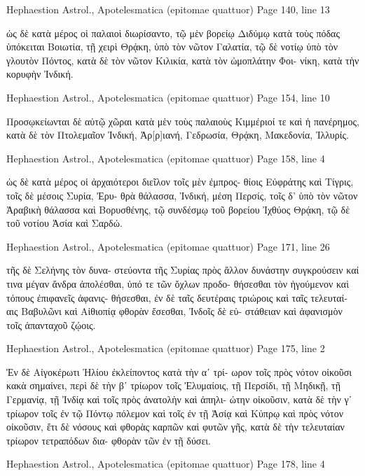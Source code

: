 \documentclass[12pt,letterpaper,twoside,final]{memoir}
\begin{document}
\begin{greek}
Hephaestion Astrol., Apotelesmatica (epitomae quattuor) 
Page 140, line 13

                                                 ὡς δὲ κατὰ 
μέρος οἱ παλαιοὶ διωρίσαντο, τῷ μὲν βορείῳ Διδύμῳ κατὰ 
τοὺς πόδας ὑπόκειται Βοιωτία, τῇ χειρὶ Θρᾴκη, ὑπὸ τὸν 
νῶτον Γαλατία, τῷ δὲ νοτίῳ ὑπὸ τὸν γλουτὸν Πόντος, 
κατὰ δὲ τὸν νῶτον Κιλικία, κατὰ τὸν ὠμοπλάτην Φοι-
νίκη, κατὰ τὴν κορυφὴν Ἰνδική. 



Hephaestion Astrol., Apotelesmatica (epitomae quattuor) 
Page 154, line 10

Προσῳκείωνται δὲ αὐτῷ χῶραι κατὰ μὲν τοὺς παλαιοὺς 
Κιμμέριοί τε καὶ ἡ πανέρημος, κατὰ δὲ τὸν Πτολεμαῖον 
Ἰνδική, Ἀρ[ρ]ιανή, Γεδρωσία, Θρᾴκη, Μακεδονία, Ἰλλυρίς. 



Hephaestion Astrol., Apotelesmatica (epitomae quattuor) 
Page 158, line 4

ὡς δὲ κατὰ μέρος οἱ ἀρχαιότεροι διεῖλον τοῖς μὲν ἐμπρος-
θίοις Εὐφράτης καὶ Τίγρις, τοῖς δὲ μέσοις Συρία, Ἐρυ-
θρὰ θάλασσα, Ἰνδική, μέση Περσίς, τοῖς δ' ὑπὸ τὸν νῶτον 
Ἀραβικὴ θάλασσα καὶ Βορυσθένης, τῷ συνδέσμῳ τοῦ 
βορείου Ἰχθύος Θρᾴκη, τῷ δὲ τοῦ νοτίου Ἀσία καὶ Σαρδώ. 



Hephaestion Astrol., Apotelesmatica (epitomae quattuor) 
Page 171, line 26

                                   τῆς δὲ Σελήνης τὸν δυνα-
στεύοντα τῆς Συρίας πρὸς ἄλλον δυνάστην συγκρούσειν καί 
τινα μέγαν ἄνδρα ἀπολέσθαι, ὑπό τε τῶν ὄχλων προδο-
θήσεσθαι τὸν ἡγούμενον καὶ τόπους ἐπιφανεῖς ἀφανις-
θήσεσθαι, ἐν δὲ ταῖς δευτέραις τριώροις καὶ ταῖς τελευταί-
αις Βαβυλῶνι καὶ Αἰθιοπίᾳ φθορὰν ἔσεσθαι, Ἰνδοῖς δὲ εὐ-
στάθειαν καὶ ἀφανισμὸν τοῖς ἁπανταχοῦ ζῴοις. 



Hephaestion Astrol., Apotelesmatica (epitomae quattuor) 
Page 175, line 2

Ἐν δὲ Αἰγοκέρωτι Ἡλίου ἐκλείποντος κατὰ τὴν αʹ τρί-
ωρον τοῖς πρὸς νότον οἰκοῦσι κακὰ σημαίνει, περὶ δὲ τὴν   
βʹ τρίωρον τοῖς Ἐλυμαίοις, τῇ Περσίδι, τῇ Μηδικῇ, τῇ 
Γερμανίᾳ, τῇ Ἰνδίᾳ καὶ τοῖς πρὸς ἀνατολὴν καὶ ἀπηλι-
ώτην οἰκοῦσιν, κατὰ δὲ τὴν γʹ τρίωρον τοῖς ἐν τῷ Πόντῳ 
πόλεμον καὶ τοῖς ἐν τῇ Ἀσίᾳ καὶ Κύπρῳ καὶ πρὸς νότον 
οἰκοῦσιν, ἔτι δὲ νόσους καὶ φθορὰς καρπῶν καὶ φυτῶν 
γῆς, κατὰ δὲ τὴν τελευταίαν τρίωρον τετραπόδων δια-
φθορὰν τῶν ἐν τῇ δύσει. 



Hephaestion Astrol., Apotelesmatica (epitomae quattuor) 
Page 178, line 4


\end{greek}
\end{document}
